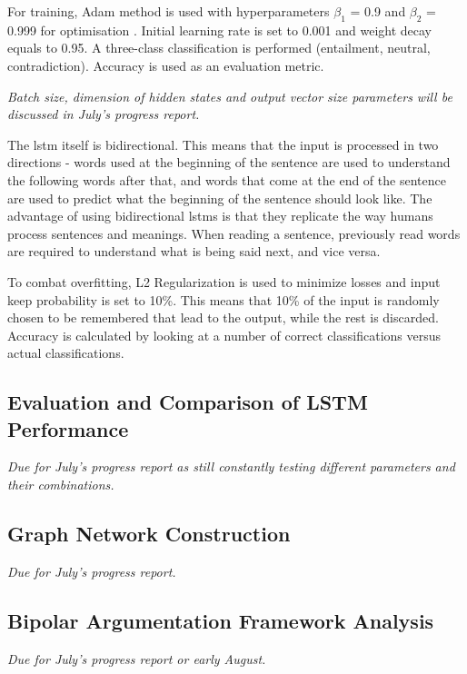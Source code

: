         For training, Adam method is used with hyperparameters $\beta_1$ = 0.9 and $\beta_2$ = 0.999 for optimisation \autocite{Kingma2015AdamAM}. Initial learning rate is set to 0.001 and weight decay equals to 0.95. A three-class classification is performed (entailment, neutral, contradiction). Accuracy is used as an evaluation metric.
        
        \textit{Batch size, dimension of hidden states and output vector size parameters will be discussed in July's progress report.}
        
        The \gls{lstm} itself is bidirectional. This means that the input is processed in two directions - words used at the beginning of the sentence are used to understand the following words after that, and words that come at the end of the sentence are used to predict what the beginning of the sentence should look like. The advantage of using bidirectional \gls{lstm}s is that they replicate the way humans process sentences and meanings. When reading a sentence, previously read words are required to understand what is being said next, and vice versa.
        
        To combat overfitting, L2 Regularization is used to minimize losses and input keep probability is set to 10\%. This means that 10\% of the input is randomly chosen to be remembered that lead to the output, while the rest is discarded. Accuracy is calculated by looking at a number of correct classifications versus actual classifications.
        
    \subsection{Evaluation and Comparison of LSTM Performance} \label{evalstm}
        \textit{Due for July's progress report as still constantly testing different parameters and their combinations.}
    
    \subsection{Graph Network Construction} \label{graphnetwork}
        \textit{Due for July's progress report.}
    
    \subsection{Bipolar Argumentation Framework Analysis} \label{bapanalysis}
        \textit{Due for July's progress report or early August.}